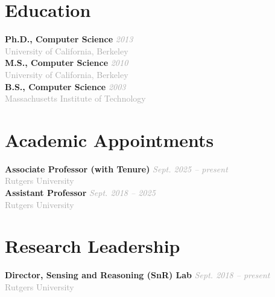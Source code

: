 \documentclass[11pt]{article}
\newcommand{\bulletpoint}{\textcolor{mBlue}{$\bullet$}}
\newcommand{\positionentry}[4]{
  \textbf{#1} \hfill \textcolor{darkGray}{\textit{#2}}\\
  \textcolor{darkGray}{#3} \hfill #4
}
\begin{document}
\begin{center}
\end{center}

\vspace{4mm}

\section{Education}
\positionentry{Ph.D., Computer Science}{2013}{University of California, Berkeley}{}\\[1mm]
\positionentry{M.S., Computer Science}{2010}{University of California, Berkeley}{}\\[1mm]
\positionentry{B.S., Computer Science}{2003}{Massachusetts Institute of Technology}{}

\section{Academic Appointments}
\positionentry{Associate Professor (with Tenure)}{Sept. 2025 -- present}{Rutgers University}{}\\[1mm]
\positionentry{Assistant Professor}{Sept. 2018 -- 2025}{Rutgers University}{}

\section{Research Leadership}
\positionentry{Director, Sensing and Reasoning (SnR) Lab}{Sept. 2018 -- present}{Rutgers University}{}
\end{document}
